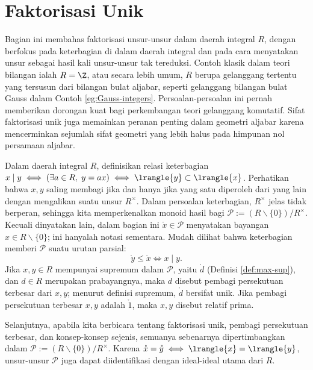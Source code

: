 \section{Faktorisasi Unik}\label{sec:UFD}
Bagian ini membahas faktorisasi unsur-unsur dalam daerah integral $R$, dengan berfokus pada keterbagian di dalam daerah integral dan pada cara menyatakan unsur sebagai hasil kali unsur-unsur tak tereduksi. Contoh klasik dalam teori bilangan ialah $R = \Z$, atau secara lebih umum, $R$ berupa gelanggang tertentu yang tersusun dari bilangan bulat aljabar, seperti gelanggang bilangan bulat Gauss dalam Contoh \ref{eg:Gauss-integers}. Persoalan-persoalan ini pernah memberikan dorongan kuat bagi perkembangan teori gelanggang komutatif. Sifat faktorisasi unik juga memainkan peranan penting dalam geometri aljabar karena mencerminkan sejumlah sifat geometri yang lebih halus pada himpunan nol persamaan aljabar.

Dalam daerah integral $R$, definisikan relasi keterbagian $x \mid y \iff (\exists a \in R, \; y=ax) \iff \lrangle{y} \subset \lrangle{x}$. Perhatikan bahwa $x,y$ saling membagi jika dan hanya jika yang satu diperoleh dari yang lain dengan mengalikan suatu unsur $R^\times$. Dalam persoalan keterbagian, $R^\times$ jelas tidak berperan, sehingga kita memperkenalkan monoid hasil bagi $\mathcal{P} := (R \smallsetminus \{0\})/R^\times$. Kecuali dinyatakan lain, dalam bagian ini $\mathring{x} \in \mathcal{P}$ menyatakan bayangan $x \in R \smallsetminus \{0\}$; ini hanyalah notasi sementara. Mudah dilihat bahwa keterbagian memberi $\mathcal{P}$ suatu urutan parsial:
\[ \mathring{y} \leq \mathring{x} \iff x \mid y. \]
Jika $x, y \in R$ mempunyai supremum dalam $\mathcal{P}$, yaitu $\mathring{d}$ (Definisi \ref{def:max-sup}), dan $d \in R$ merupakan prabayangnya, maka $d$ disebut pembagi persekutuan terbesar dari $x,y$; menurut definisi supremum, $\mathring{d}$ bersifat unik. Jika pembagi persekutuan terbesar $x,y$ adalah $\mathring{1}$, maka $x,y$ disebut relatif prima.

Selanjutnya, apabila kita berbicara tentang faktorisasi unik, pembagi persekutuan terbesar, dan konsep-konsep sejenis, semuanya sebenarnya dipertimbangkan dalam $\mathcal{P} := (R \smallsetminus \{0\})/R^\times$. Karena $\mathring{x} = \mathring{y} \iff \lrangle{x}=\lrangle{y}$, unsur-unsur $\mathcal{P}$ juga dapat diidentifikasi dengan ideal-ideal utama dari $R$.

